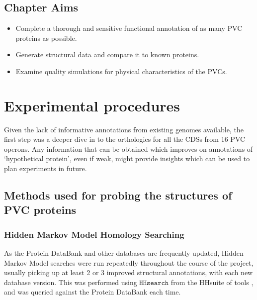 \subsection*{Chapter Aims}

\begin{itemize}
	\item Complete a thorough and sensitive functional annotation of as many PVC proteins as possible.
	\item Generate structural data and compare it to known proteins.
	\item Examine quality simulations for physical characteristics of the PVCs.

\end{itemize}

\clearpage

\section{Experimental procedures}
Given the lack of informative annotations from existing genomes available, the first step was a deeper dive in to the orthologies for all the CDSs from 16 PVC operons. Any information that can be obtained which improves on annotations of `hypothetical protein', even if weak, might provide insights which can be used to plan experiments in future.

\subsection{Methods used for probing the structures of PVC proteins}
\subsubsection{Hidden Markov Model Homology Searching}\label{hhresults}
As the Protein DataBank and other databases are frequently updated, Hidden Markov Model searches were run repeatedly throughout the course of the project, usually picking up at least 2 or 3 improved structural annotations, with each new database version. This was performed using $\mathtt{HHsearch}$ from the HHsuite of tools \citep{Remmert2012}, and was queried against the Protein DataBank each time.
	

